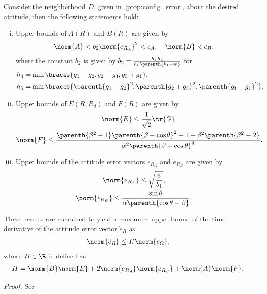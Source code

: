 \begin{prop}\label{prop:eR_dot_bound}
Consider the neighborhood \( D \), given in~\cref{prop:config_error}, about the desired attitude, then the following statements hold:
\begin{enumerate}[(i)]
    \item \label{item:prop_eR_dot_bound_AB} Upper bounds of \( A(R) \) and \( B(R) \) are given by
        \begin{gather}
            \norm{A} < b_2 \norm{e_{R_A}}^2 < c_A  , \quad \norm{B} < c_B . \label{eqn:AB_bound}
        \end{gather}
        where the constant \( b_2\) is given by \( b_2 = \frac{h_1 h_4}{h_5 \parenth{h_1 - \psi}}\) for
        \begin{align*}
            h_4 &= \min\braces{g_1 + g_2, g_2 + g_3 , g_3 + g_1} ,\\
            h_5 &= \min\braces{\parenth{g_1 + g_2}^2,\parenth{g_2 + g_3}^2 , \parenth{g_3 + g_1}^2} .\\
        \end{align*}
    \item \label{item:prop_eR_dot_bound_EF} Upper bounds of \( E(R,R_d) \) and \( F(R) \) are given by
        \begin{gather}
            \norm{E} \leq \frac{1}{\sqrt{2}} \tr{G}  , \label{eqn:E_bound} \\
            \norm{F} \leq \frac{\parenth{\beta^2 + 1}\parenth{\beta - \cos \theta}^2 + 1 + \beta^2 \parenth{\beta^2-2}}{\alpha^2 \parenth{\beta-\cos \theta}^4} . \label{eqn:F_bound}
        \end{gather}
    \item Upper bounds of the attitude error vectors \( e_{R_A} \) and \( e_{R_B} \) are given by
        \begin{gather}
            \norm{e_{R_A}} \leq \sqrt{\frac{\psi}{b_1}}, \label{eqn:eRA_bound} \\
            \norm{e_{R_B}} \leq \frac{\sin\theta}{\alpha \parenth{\cos \theta - \beta}}. \label{eqn:eRB_bound}
        \end{gather}
\end{enumerate}
These results are combined to yield a maximum upper bound of the time derivative of the attitude error vector \( \dot{e}_R \) as
\begin{gather}
	\norm{\dot{e}_R} \leq H \norm{e_\Omega} ,\label{eqn:eR_bound}
\end{gather}
where  \( H \in \R \) is defined as
\begin{gather}
	H = \norm{B} \norm{E} + 2 \norm{e_{R_A}} \norm{e_{R_B}} + \norm{A}\norm{F}. \label{eqn:H}
\end{gather}
\end{prop}
\begin{proof}
See~
\end{proof}

